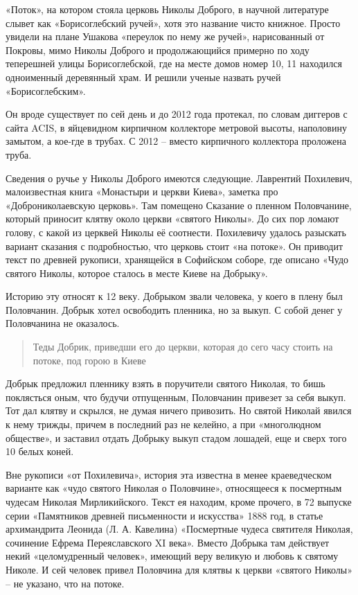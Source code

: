«Поток», на котором стояла церковь Николы Доброго, в научной литературе слывет как «Борисоглебский ручей», хотя это название чисто книжное. Просто увидели на плане Ушакова «переулок по нему же ручей», нарисованный от Покровы, мимо Николы Доброго и продолжающийся примерно по ходу теперешней улицы Борисоглебской, где на месте домов номер 10, 11 находился одноименный деревянный храм. И решили ученые назвать ручей «Борисоглебским».

Он вроде существует по сей день и до 2012 года протекал, по словам диггеров с сайта ACIS, в яйцевидном кирпичном коллекторе метровой высоты, наполовину замытом, а кое-где в трубах. С 2012 – вместо кирпичного коллектора проложена труба.

Сведения о ручье у Николы Доброго имеются следующие. Лаврентий Похилевич, малоизвестная книга «Монастыри и церкви Киева»\cite{pohilmon}, заметка про «Доброниколаевскую церковь». Там помещено Сказание о пленном Половчанине, который приносит клятву около церкви «святого Николы». До сих пор ломают голову, с какой из церквей Николы её соотнести. Похилевичу удалось разыскать вариант сказания с подробностью, что церковь стоит «на потоке». Он приводит текст по древней рукописи, хранящейся в Софийском соборе, где описано «Чудо святого Николы, которое сталось в месте Киеве на Добрыку».

Историю эту относят к 12 веку. Добрыком звали человека, у коего в плену был Половчанин. Добрык хотел освободить пленника, но за выкуп. С собой денег у Половчанина не оказалось.

\begin{quotation}
Теды Добрик, приведши его до церкви, которая до сего часу стоить на потоке, под горою в Киеве
\end{quotation}

Добрык предложил пленнику взять в поручители святого Николая, то бишь поклясться оным, что будучи отпущенным, Половчанин привезет за себя выкуп. Тот дал клятву и скрылся, не думая ничего привозить. Но святой Николай явился к нему трижды, причем в последний раз не келейно, а при «многолюдном обществе», и заставил отдать Добрыку выкуп стадом лошадей, еще и сверх того 10 белых коней.

Вне рукописи «от Похилевича», история эта известна в менее краеведческом варианте как «чудо святого Николая о Половчине», относящееся к посмертным чудесам Николая Мирликийского. Текст ея находим, кроме прочего, в 72 выпуске серии «Памятников древней письменности и искусства» 1888 год, в статье архимандрита Леонида (Л. А. Кавелина) «Посмертные чудеса святителя Николая, сочинение Ефрема Переяславского XI века». Вместо Добрыка там действует некий «целомудренный человек», имеющий веру великую и любовь к святому Николе. И сей человек привел Половчина для клятвы к церкви «святого Николы» – не указано, что на потоке.

